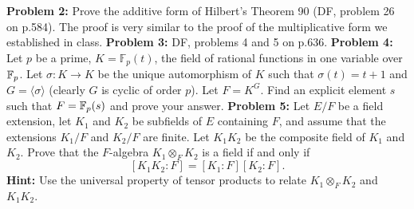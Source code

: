 \documentclass[12pt]{amsart}
\begin{document}
\skv
{\bf Problem 2:} Prove the additive form of Hilbert's Theorem 90 (DF, problem 26 on p.584). The proof is very similar to the proof
of the multiplicative form we established in class. 
\skv
{\bf Problem 3:} DF, problems 4 and 5 on p.636.  
\skv
{\bf Problem 4:} Let $p$ be a prime, $K=\mathbb F_p(t)$, the field of rational functions in one variable over ${\mathbb F}_p$.
Let $\sigma:K\to K$ be the unique automorphism of $K$ such that $\sigma(t)=t+1$ and $G=\langle \sigma\rangle$ (clearly
$G$ is cyclic of order $p$). Let $F=K^G$. Find an explicit element $s$ such that $F={\mathbb F}_p(s)$ and prove your answer.
\skv
{\bf Problem 5:} 
Let $E/F$ be a field extension, let $K_1$ and $K_2$ be subfields of $E$ containing $F$,
and assume that the extensions $K_1/F$ and $K_2/F$ are finite. Let $K_1 K_2$ be the composite
field of $K_1$ and $K_2$. Prove that the $F$-algebra $K_1\otimes_F K_2$ is a field if and only if
$$[K_1 K_2: F]=[K_1: F][K_2: F].$$ {\bf Hint:} Use the universal property of tensor products to relate
$K_1\otimes_F K_2$ and $K_1 K_2$.
\end{document}
